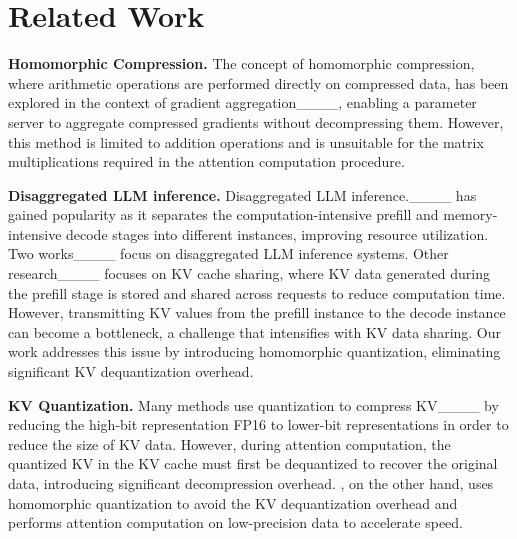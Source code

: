 \section{Related Work}
\medskip
\noindent \textbf{Homomorphic Compression.}
The concept of homomorphic compression, where arithmetic operations are performed directly on compressed data, has been explored in the context of gradient aggregation____, enabling a parameter server to aggregate compressed gradients without decompressing them. However, this method is limited to addition operations and is unsuitable for the matrix multiplications required in the attention computation procedure.

\medskip
\noindent \textbf{Disaggregated LLM inference.} Disaggregated LLM inference.____ has gained popularity as it separates the computation-intensive prefill and memory-intensive decode stages into different instances, improving resource utilization.
Two works____ focus on disaggregated LLM inference systems. Other research____ focuses on KV cache sharing, where KV data generated during the prefill stage is stored and shared across requests to reduce computation time. However, transmitting KV values from the prefill instance to the decode instance can become a bottleneck, a challenge that intensifies with KV data sharing. Our work addresses this issue by introducing homomorphic quantization, eliminating significant KV dequantization overhead.


\medskip
\noindent\textbf{KV Quantization.}
Many methods use quantization to compress KV____ by reducing the high-bit representation FP16 to lower-bit representations in order to reduce the size of KV data. %
However, during attention computation, the quantized KV in the KV cache must first be dequantized to recover the original data, introducing significant decompression overhead. \sys, on the other hand, uses homomorphic quantization to avoid the KV dequantization overhead and performs attention computation on low-precision data to accelerate speed.


